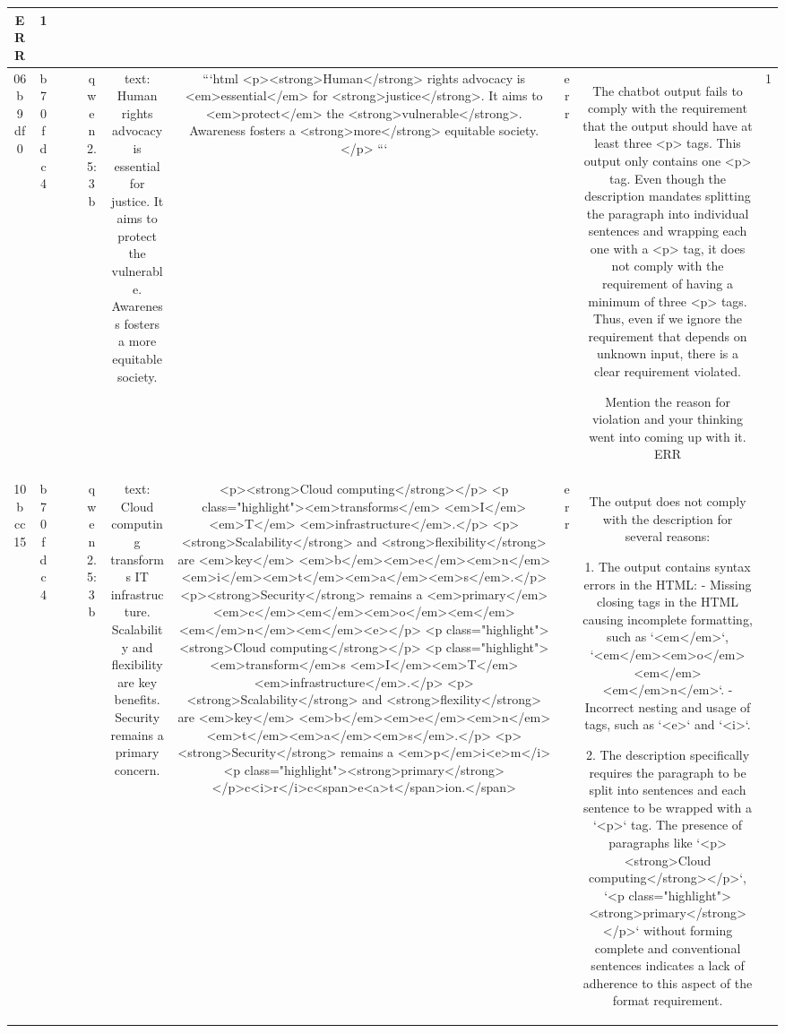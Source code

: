 \begin{table}[h!]
\begin{tabular}{|c|c|c|c|c|c|c|c|c|c|}
ERR & 1\\
\hline
06b9df0 & b70fdc4 &  &  & qwen2.5:3b & text: Human rights advocacy is essential for justice. It aims to protect the vulnerable. Awareness fosters a more equitable society. & ```html
<p><strong>Human</strong> rights advocacy is <em>essential</em> for <strong>justice</strong>. It aims to <em>protect</em> the <strong>vulnerable</strong>. Awareness fosters a <strong>more</strong> equitable society.</p>
``` & err & The chatbot output fails to comply with the requirement that the output should have at least three <p> tags. This output only contains one <p> tag. Even though the description mandates splitting the paragraph into individual sentences and wrapping each one with a <p> tag, it does not comply with the requirement of having a minimum of three <p> tags. Thus, even if we ignore the requirement that depends on unknown input, there is a clear requirement violated.

Mention the reason for violation and your thinking went into coming up with it.
ERR & 1\\
\hline
10bcc15 & b70fdc4 &  &  & qwen2.5:3b & text: Cloud computing transforms IT infrastructure. Scalability and flexibility are key benefits. Security remains a primary concern. & <p><strong>Cloud computing</strong></p>
<p class="highlight"><em>transforms</em> <em>I</em><em>T</em> <em>infrastructure</em>.</p>
<p><strong>Scalability</strong> and <strong>flexibility</strong> are <em>key</em> <em>b</em><em>e</em><em>n</em><em>i</em><em>t</em><em>a</em><em>s</em>.</p>
<p><strong>Security</strong> remains a <em>primary</em> <em>c</em><em</em><em>o</em><em</em><em</em>n</em><em</em><e></p>
<p class="highlight"><strong>Cloud computing</strong></p>
<p class="highlight"><em>transform</em>s <em>I</em><em>T</em> <em>infrastructure</em>.</p>
<p><strong>Scalability</strong> and <strong>flexility</strong> are <em>key</em> <em>b</em><em>e</em><em>n</em><em>t</em><em>a</em><em>s</em>.</p>
<p><strong>Security</strong> remains a <em>p</em>i<e>m</i><p class="highlight"><strong>primary</strong></p>c<i>r</i>c<span>e<a>t</span>ion.</span> & err & The output does not comply with the description for several reasons:

1. The output contains syntax errors in the HTML:
   - Missing closing tags in the HTML causing incomplete formatting, such as `<em</em>`, `<em</em><em>o</em><em</em><em</em>n</em>`.
   - Incorrect nesting and usage of tags, such as `<e>` and `<i>`.

2. The description specifically requires the paragraph to be split into sentences and each sentence to be wrapped with a `<p>` tag. The presence of paragraphs like `<p><strong>Cloud computing</strong></p>`, `<p class="highlight"><strong>primary</strong></p>` without forming complete and conventional sentences indicates a lack of adherence to this aspect of the format requirement.


\end{tabular}
\end{table}
